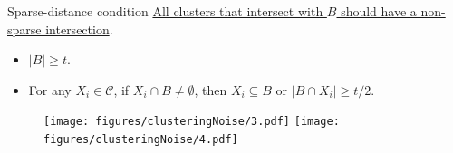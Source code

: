 \documentclass{beamer}
\newcommand{\mc}{\mathcal}
\begin{document}
\begin{frame}{Sparse-distance condition}
    \hyperlink{positiveSparseNoise}{All clusters that intersect with $B$ should have a non-sparse intersection}. 
	\begin{itemize}
	  \item $|B| \ge t$.
	  \item For any $X_i \in \mc C$, if $X_i \cap B \neq \emptyset$, then $X_i \subseteq B$ or $|B \cap X_i| \ge t/2$.
	\end{itemize}

   \begin{figure}
   	  \centering
	  \texttt{[image: figures/clusteringNoise/3.pdf]}
	  \texttt{[image: figures/clusteringNoise/4.pdf]}
   \end{figure}
\end{frame}
\end{document}
